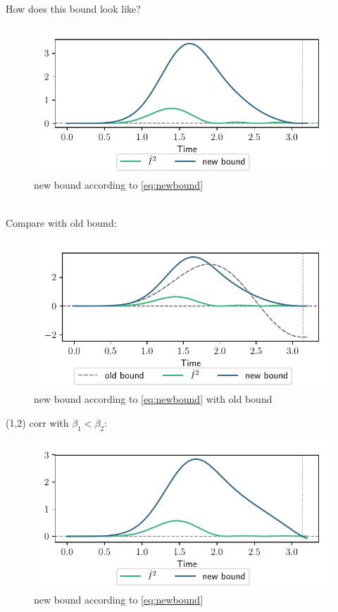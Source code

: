 \documentclass{book}
\numberwithin{equation}{section} %
\begin{document}
How does this bound look like?
\begin{figure}[h!]
    \centering
    \includegraphics{alltheplots/newbound/corr12_same_beta_bound.pdf}
    \caption{new bound according to \cref{eq:newbound}}
    \label{fig:newbound_corr12_same_beta_no_old}
\end{figure}\\
Compare with old bound:
\begin{figure}[h!]
    \centering
    \includegraphics{alltheplots/newbound/corr12_same_beta_bound_with_old_bound.pdf}
    \caption{new bound according to \cref{eq:newbound} with old bound}
    \label{fig:newbound_corr12_same_beta_with_old} 
\end{figure}
(1,2) corr with $\beta_1<\beta_2$:
\begin{figure}[h!]
    \centering
    \includegraphics{alltheplots/newbound/corr12_beta1<beta2_bound_no_old_bound.pdf}
    \caption{new bound according to \cref{eq:newbound}}
    \label{fig:newbound_corr12_beta1<beta2_no_old}
\end{figure}\\
\end{document}
